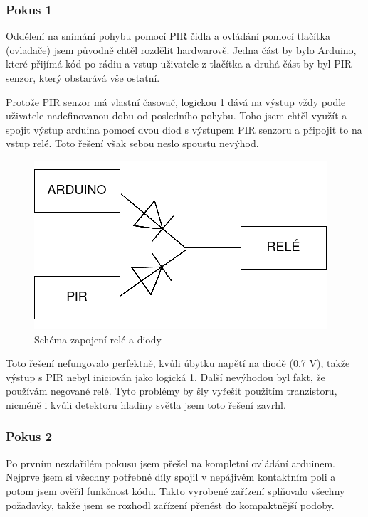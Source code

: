 \documentclass[11pt,a4paper,twoside,openright]{report}
\begin{document}
\subsubsection{Pokus 1}

Oddělení na snímání pohybu pomocí PIR čidla a ovládání pomocí tlačítka (ovladače) jsem původně chtěl rozdělit hardwarově. Jedna část by bylo Arduino, které přijímá kód po rádiu a vstup uživatele z tlačítka a druhá část by byl PIR senzor, který obstarává vše ostatní.


Protože PIR senzor má vlastní časovač, logickou 1 dává na výstup vždy podle uživatele nadefinovanou dobu od posledního pohybu. Toho jsem chtěl využít a spojit výstup arduina pomocí dvou diod s výstupem PIR senzoru a připojit to na vstup relé. Toto řešení však sebou neslo spoustu nevýhod. 

\begin{figure}[htb]
\centering
\includegraphics[width=0.5\hsize]{img/zapojeni_rele.png}
\caption{Schéma zapojení relé a diody}\end{figure}

Toto řešení nefungovalo perfektně, kvůli úbytku napětí na diodě (0.7 V), takže výstup s PIR nebyl iniciován jako logická 1. Další nevýhodou byl fakt, že používám negované relé. Tyto problémy by šly vyřešit použitím tranzistoru, nicméně i kvůli detektoru hladiny světla jsem toto řešení zavrhl.

\subsubsection{Pokus 2}

Po prvním nezdařilém pokusu jsem přešel na kompletní ovládání arduinem. Nejprve jsem si všechny potřebné díly spojil v nepájivém kontaktním poli a potom jsem ověřil funkčnost kódu. Takto vyrobené zařízení splňovalo všechny požadavky, takže jsem se rozhodl zařízení přenést do kompaktnější podoby.
\end{document}
